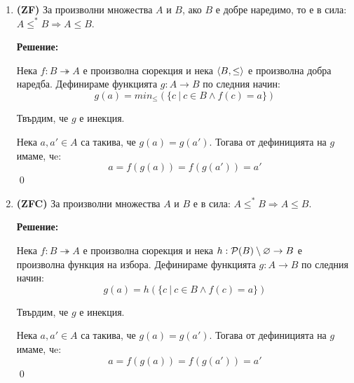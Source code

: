 \begin{problem}
\begin{enumerate}
\item
\textbf{(ZF)}
За произволни множества $A$ и $B$, ако $B$ е добре наредимо, то е в сила:
$A \leq^* B \Rightarrow A \leq B$.

\textbf{Решение:}

\smallbreak
\quad
Нека $f: B \twoheadrightarrow A$ е произволна сюрекция и нека $\langle B, \leq \rangle$ е произволна добра наредба.
Дефинираме функцията $g: A \rightarrow B$ по следния начин:
\[
g(a) = min_{\leq}(\{c\ |\ c \in B \land f(c) = a\})
\]

\quad
Твърдим, че $g$ е инекция.

\begin{tcolorbox}[mybox={Доказателство:}]
\quad
Нека $a, a' \in A$ са такива, че $g(a) = g(a')$.
Тогава от дефиницията на $g$ имаме, чe:
\[
a = f(g(a)) = f(g(a')) = a'
\]
\qed
\end{tcolorbox}


\item
\textbf{(ZFC)}
За произволни множества $A$ и $B$ е в сила:
$A \leq^* B \Rightarrow A \leq B$.

\textbf{Решение:}

\smallbreak
\quad
Нека $f: B \twoheadrightarrow A$ е произволна сюрекция
и нека $h: \mathcal{P}(B) \setminus \varnothing \to B$ е произволна функция на избора.
Дефинираме функцията $g: A \rightarrow B$ по следния начин:
\[
g(a) = h(\{c\ |\ c \in B \land f(c) = a\})
\]

\quad
Твърдим, че $g$ е инекция.

\begin{tcolorbox}[mybox={Доказателство:}]
\quad
Нека $a, a' \in A$ са такива, че $g(a) = g(a')$.
Тогава от дефиницията на $g$ имаме, чe:
\[
a = f(g(a)) = f(g(a')) = a'
\]
\qed
\end{tcolorbox}


\end{enumerate}
\end{problem}
